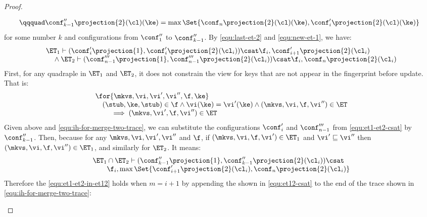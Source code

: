 \begin{proof}
\begin{itemize}
\begin{itemize}
\begin{itemize}
\begin{equation}
\begin{array}{@{}l}
        \qqquad \conf''_{k-1}\projection{2}(\cl)(\ke) = \max\Set{\conf_n\projection{2}(\cl)(\ke), \conf'_i\projection{2}(\cl)(\ke)}
\end{array}
\end{equation}
for some number \( k \) and configurations from \( \conf''_1 \) to \( \conf''_{k-1} \).
By \cref{equ:last-et-2} and \cref{equ:new-et-1}, we have:
\begin{equation}
    \label{equ:et1-et2-csat}
    \begin{array}{@{} l@{}}
    \ET_1 \vdash ( \conf'_{i}\projection{1}, \conf'_{i}\projection{2}(\cl_{i}) )  \csat \f_{i}, \conf'_{i+1}\projection{2}(\cl_{i})  \\
    \quad {} \land \ET_2 \vdash ( \conf'''_{n-1}\projection{1}, \conf'''_{n-1}\projection{2}(\cl_{i}) )  \csat \f_{i}, \conf_{n}\projection{2}(\cl_{i})
    \end{array}
\end{equation}
First, for any quadraple in \( \ET_1 \) and \( \ET_2 \), it does not constrain the view for keys that are not appear in the fingerprint before update.
That is:
\[
    \begin{array}{@{}l@{}}
    \for{ \mkvs, \vi, \vi', \vi'', \f, \ke } \\ 
    \quad (\stub, \ke, \stub) \in \f \land \vi(\ke) = \vi'(\ke) \land (\mkvs, \vi, \f, \vi'') \in \ET \\
    \qquad {} \implies (\mkvs, \vi', \f, \vi'') \in \ET
    \end{array}
\]
Given above and \cref{equ:ih-for-merge-two-trace}, we can substitute the configurations \( \conf'_{i} \) and  \( \conf'''_{n-1} \) from \cref{equ:et1-et2-csat} by \( \conf''_{k-1}\).
Then,  because for any \( \mkvs, \vi, \vi', \vi'' \) and \( \f \), if \( (\mkvs, \vi, \f, \vi' ) \in \ET_1 \) and \( \vi' \sqsubseteq \vi'' \) then \( (\mkvs, \vi, \f, \vi'' ) \in \ET_1 \), and similarly for \( \ET_2 \).
It means:
\begin{equation}
    \label{equ:et12-csat}
    \begin{array}{l}
    \ET_1 \cap \ET_2 \vdash ( \conf''_{k-1}\projection{1}, \conf''_{k-1}\projection{2}(\cl_{i}) )  \csat \\
    \qquad \f_{i}, \max\Set{\conf'_{i+1}\projection{2}(\cl_{i}), \conf_{n}\projection{2}(\cl_{i})}
    \end{array}
\end{equation}
Therefore the \cref{equ:et1-et2-in-et12} holds when \( m = i + 1\) by appending the shown in \cref{equ:et12-csat} to the end of the trace shown in \cref{equ:ih-for-merge-two-trace}:

\end{itemize}
\end{itemize}
\end{itemize}
\end{proof}
